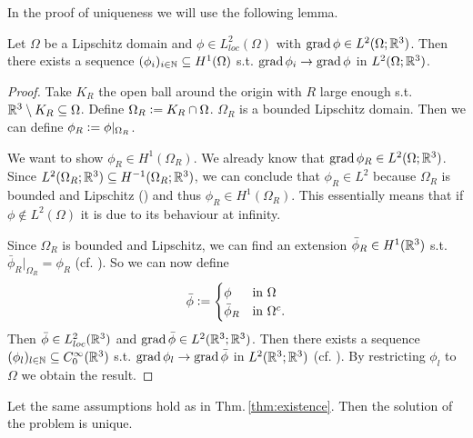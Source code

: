 \documentclass[../master_thesis.tex]{subfiles}
\begin{document}
In the proof of uniqueness we will use the following lemma. 
\begin{lemma}\label{lem:gradient_sequence}
    Let $\Omega$ be a Lipschitz domain and $\phi \in L^2_{loc}(\Omega)$ 
    with $\operatorname{grad} \phi \in L^2(\Omega;\mathbb{R}^3)$. Then 
    there exists a sequence $(\phi_i)_{i \in \mathbb{N}} \subseteq H^1(\Omega)$
    s.t. $\operatorname{grad} \phi_i \rightarrow \operatorname{grad} \phi$ in $L^2(\Omega;\mathbb{R}^3)$.
\end{lemma}
\begin{proof}
    Take $K_R$ the open ball around the origin with $R$ large enough 
    s.t. $\mathbb{R}^3 \setminus K_R \subseteq \Omega$. 
    Define $\Omega_R \vcentcolon= K_R \cap \Omega$. $\Omega_R$ is a bounded Lipschitz 
    domain.
    Then we can define $\phi_R \vcentcolon= \phi|_{\Omega_R}$.

    We want to show $\phi_R \in H^1(\Omega_R)$. We already know that $\operatorname{grad} \phi_R \in L^2(\Omega; \mathbb{R}^3)$.
    Since $L^2(\Omega_R; \mathbb{R}^3) \subseteq H^{-1}(\Omega_R;\mathbb{R}^3)$, we can conclude that 
    $\phi_R \in L^2$ because $\Omega_R$ is bounded and Lipschitz (\cite[Lemma 3.11]{monk}) 
    and thus $\phi_R \in H^1(\Omega_R)$. This essentially means that 
    if $\phi \notin L^2(\Omega)$ it is due to its behaviour at infinity.

    Since $\Omega_R$ is bounded and Lipschitz, we can find an extension $\bar{\phi}_R \in H^1(\mathbb{R}^3)$ 
    s.t. $\bar{\phi}_R|_{\Omega_R} =\phi_R$ (cf. \cite[Sec.\,1.5.1]{mazya}).
    So we can now define
    \begin{align*}
    \bar{\phi} \vcentcolon=
    \begin{cases}
        \phi & \mbox{in $\Omega$}\\
        \bar{\phi}_R & \mbox{in $\Omega^c$.}\\
    \end{cases}
    \end{align*}
    Then $\bar{\phi} \in L^2_{loc}(\mathbb{R}^3)$ and 
    $\operatorname{grad} \bar{\phi} \in L^2(\mathbb{R}^3;\mathbb{R}^3)$. 
    Then there exists a sequence 
    $(\phi_l) _{l \in \mathbb{N}} \subseteq C^\infty_0(\mathbb{R}^3)$ s.t.
    $\operatorname{grad} \phi_l \rightarrow \operatorname{grad} \bar{\phi}$ in $L^2(\mathbb{R}^3;\mathbb{R}^3)$ 
    (cf. \cite[Lemma 1.1]{simader}). By restricting $\phi_l$ to $\Omega$ 
    we obtain the result.
\end{proof}


\begin{theorem}
    Let the same assumptions hold as in Thm.\,\ref{thm:existence}.
    Then the solution of the problem is unique.
\end{theorem}
\end{document}
